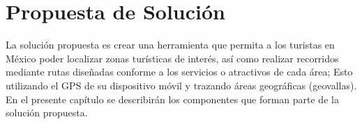\chapter{Propuesta de Solución}
La solución propuesta es crear una herramienta que permita a los turistas en México poder localizar zonas turísticas de interés, así como realizar recorridos mediante rutas diseñadas conforme a los servicios o atractivos de cada área; Esto utilizando el GPS de su dispositivo móvil y trazando áreas geográficas (geovallas). En el presente capítulo se describirán los componentes que forman parte de la solución propuesta. 











